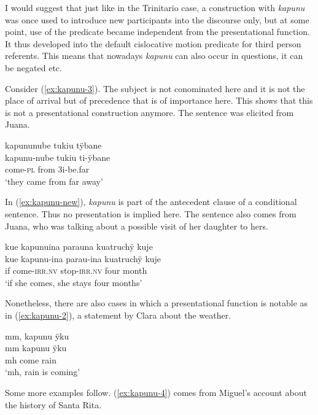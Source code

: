 I would suggest that just like in the Trinitario case, a construction with \textit{kapunu} was once used to introduce new participants into the discourse only, but at some point, use of the predicate became independent from the presentational function. It thus developed into the default cislocative motion predicate for third person referents. This means that nowadays \textit{kapunu} can also occur in questions, it can be negated etc.

\newpage
Consider (\ref{ex:kapunu-3}). The subject is not conominated here and it is not the place of arrival but of precedence that is of importance here. This shows that this is not a presentational construction anymore. The sentence was elicited from Juana.

\ea\label{ex:kapunu-3}
\begingl 
\glpreamble kapununube tukiu tÿbane\\
\gla kapunu-nube tukiu ti-ÿbane\\ 
\glb come-\textsc{pl} from 3i-be.far\\ 
\glft ‘they came from far away’
\trailingcitation{[jmx-e090727s.320]}
\xe

In (\ref{ex:kapunu-new}), \textit{kapunu} is part of the antecedent clause of a conditional sentence. Thus no presentation is implied here. The sentence also comes from Juana, who was talking about a possible visit of her daughter to hers.

\ea\label{ex:kapunu-new}
\begingl
\glpreamble kue kapunuina parauna kuatruchÿ kuje\\
\gla kue kapunu-ina parau-ina kuatruchÿ kuje\\
\glb if come-\textsc{irr.nv} stop-\textsc{irr.nv} four month\\
\glft ‘if she comes, she stays four months’
\endgl
\trailingcitation{[jxx-p110923l-1.425]}
\xe

Nonetheless, there are also cases in which a presentational function is notable as in (\ref{ex:kapunu-2}), a statement by Clara about the weather.

\ea\label{ex:kapunu-2}
\begingl 
\glpreamble mm, kapunu ÿku\\
\gla mm kapunu ÿku\\ 
\glb mh come rain\\ 
\glft ‘mh, rain is coming’
\trailingcitation{[cux-120410ls.257]}
\xe

 
Some more examples follow. (\ref{ex:kapunu-4}) comes from Miguel’s account about the history of Santa Rita.

